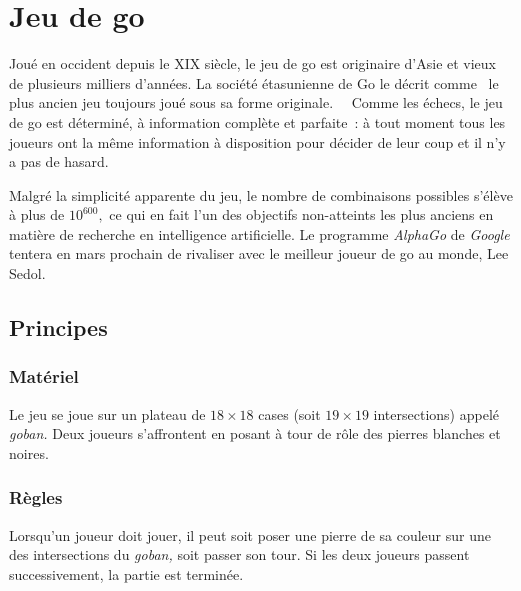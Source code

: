 
\newcommand{\fillstone}[3]{
\draw [fill=#3] (#1,#2) circle (.4);
}


\chapter{Jeu de go}

Joué en occident depuis le XIX siècle, le jeu de go est originaire
d'Asie et vieux de plusieurs milliers d'années. La société étasunienne
de Go le décrit comme \flqq~le plus ancien jeu toujours joué sous
sa forme originale.~\frqq~\cite{ggo-aga}
Comme les échecs, le jeu de go est déterminé, à information complète
et parfaite~: à tout moment tous les joueurs ont la même information
à disposition pour décider de leur coup et il n'y a pas de hasard.~\cite{game-theory-wiki}

Malgré la simplicité apparente du jeu, le nombre de combinaisons possibles
s'élève à plus de $10^{600},$ ce qui en fait l'un des objectifs non-atteints
les plus anciens en matière de recherche en intelligence artificielle.
Le programme \emph{AlphaGo} de \emph{Google} tentera en mars prochain de rivaliser
avec le meilleur joueur de go au monde, Lee Sedol.~\cite{ggo-ai,ggo-compqueens}

\section{Principes}

\subsection{Matériel}

Le jeu se joue sur un plateau de $18 \times 18$ cases (soit
$19 \times 19$ intersections) appelé \emph{goban.} Deux joueurs
s'affrontent en posant à tour de rôle des pierres blanches
et noires.

\subsection{Règles}

Lorsqu'un joueur doit jouer, il peut soit poser une pierre
de sa couleur sur une des intersections du \emph{goban,} soit passer son tour.
Si les deux joueurs passent successivement, la partie est terminée.~\cite{ggo-ffg}

